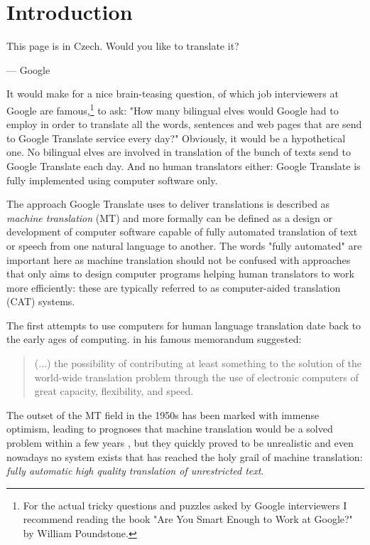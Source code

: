 \chapter{Introduction}
\label{chap:introduction}

\setlength{\epigraphwidth}{1.0\textwidth}
\epigraph{This page is in Czech. Would you like to translate it?}{--- Google}

It would make for a nice brain-teasing question, of which job interviewers
at Google are famous,\footnote{For the actual tricky questions and puzzles
asked by Google interviewers I recommend reading the book "Are You Smart
Enough to Work at Google?" by William Poundstone.} to ask:
"How many bilingual elves would Google had to employ in order to translate
all the words, sentences and web pages that are send to Google Translate
service every day?"
Obviously, it would be a hypothetical one. No bilingual elves are involved
in translation of the bunch of texts send to Google Translate each day.
And no human translators either: Google Translate is fully implemented using
computer software only.

The approach Google Translate uses to deliver translations is described as
\emph{machine translation} (MT) and more formally can be defined as a design
or development of computer software capable of fully automated translation
of text or speech from one natural language to another.
The words "fully automated" are important here as machine translation should
not be confused with approaches that only aims to design computer programs
helping human translators to work more efficiently: these are typically
referred to as computer-aided translation (CAT) systems.

The first attempts to use computers for human language translation date
back to the early ages of computing. \citet{weaver:memorandum} in his famous
memorandum suggested:
\begin{quote}
(...) the possibility of contributing at least
something to the solution of the world-wide translation problem through the use
of electronic computers of great capacity, flexibility, and speed.
\end{quote}
The outset of the MT field in the 1950s has been marked with immense optimism,
leading to prognoses that machine translation would be a solved problem within
a few years \citep{hutchins:mt}, but they quickly proved to be unrealistic and
even nowadays no system exists that has reached the holy grail of machine translation:
\emph{fully automatic high quality translation of unrestricted text}.

